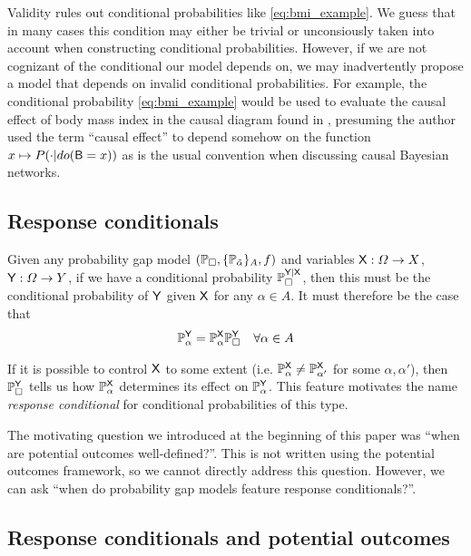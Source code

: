 Validity rules out conditional probabilities like \ref{eq:bmi_example}. We guess that in many cases this condition may either be trivial or unconsiously taken into account when constructing conditional probabilities. However, if we are not cognizant of the conditional our model depends on, we may inadvertently propose a model that depends on invalid conditional probabilities. For example, the conditional probability \ref{eq:bmi_example} would be used to evaluate the causal effect of body mass index in the causal diagram found in \citet{shahar_association_2009}, presuming the author used the term ``causal effect'' to depend somehow on the function $x\mapsto P(\cdot|do(\mathsf{B}=x))$ as is the usual convention when discussing causal Bayesian networks.


\subsection{Response conditionals}

Given any probability gap model $(\mathbb{P}_\square,\{\mathbb{P}_{\tilde{\alpha}}\}_A,f)$ and variables $\mathsf{X}:\Omega\to X$, $\mathsf{Y}:\Omega\to Y$, if we have a conditional probability $\mathbb{P}_\square^{\mathsf{Y}|\mathsf{X}}$, then this must be the conditional probability of $\mathsf{Y}$ given $\mathsf{X}$ for any $\alpha\in A$. It must therefore be the case that
\begin{align}
    \mathbb{P}_\alpha^{\mathsf{Y}} &= \mathbb{P}_\alpha^{\mathsf{X}}\mathbb{P}_\square^{\mathsf{Y}}&\forall \alpha\in A
\end{align}

If it is possible to control $\mathsf{X}$ to some extent (i.e. $\mathbb{P}_\alpha^{\mathsf{X}}\neq\mathbb{P}_{\alpha'}^{\mathsf{X}}$ for some $\alpha,\alpha'$), then $\mathbb{P}_\square^{\mathsf{Y}}$ tells us how $\mathbb{P}_\alpha^{\mathsf{X}}$ determines its effect on $\mathbb{P}_\alpha^{\mathsf{Y}}$. This feature motivates the name \emph{response conditional} for conditional probabilities of this type.

The motivating question we introduced at the beginning of this paper was ``when are potential outcomes well-defined?''. This is not written using the potential outcomes framework, so we cannot directly address this question. However, we can ask ``when do probability gap models feature response conditionals?''.

\subsection{Response conditionals and potential outcomes}\label{sec:curry}

